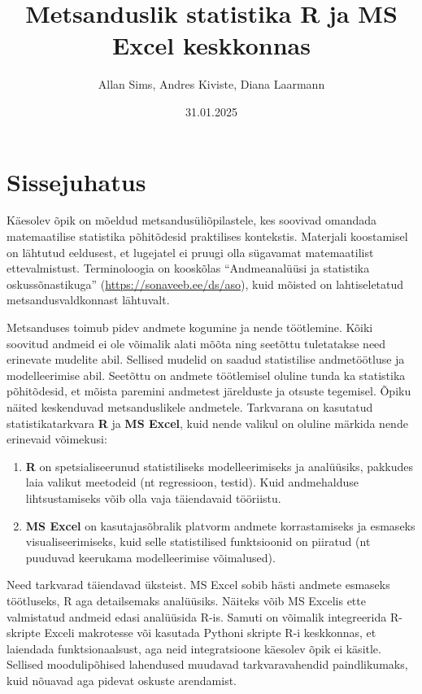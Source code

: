 \documentclass[
]{book}
\title{Metsanduslik statistika R ja MS Excel keskkonnas}
\author{Allan Sims, Andres Kiviste, Diana Laarmann}
\date{31.01.2025}
\providecommand{\tightlist}{%
  \setlength{\itemsep}{0pt}\setlength{\parskip}{0pt}}
\begin{document}
\maketitle

{
\setcounter{tocdepth}{1}
\tableofcontents
}
\chapter{Sissejuhatus}\label{sissejuhatus}

Käesolev õpik on mõeldud metsandusüliõpilastele, kes soovivad omandada matemaatilise statistika põhitõdesid praktilises kontekstis. Materjali koostamisel on lähtutud eeldusest, et lugejatel ei pruugi olla sügavamat matemaatilist ettevalmistust. Terminoloogia on kooskõlas ``Andmeanalüüsi ja statistika oskussõnastikuga'' (\url{https://sonaveeb.ee/ds/aso}), kuid mõisted on lahtiseletatud metsandusvaldkonnast lähtuvalt.

Metsanduses toimub pidev andmete kogumine ja nende töötlemine. Kõiki soovitud andmeid ei ole võimalik alati mõõta ning seetõttu tuletatakse need erinevate mudelite abil. Sellised mudelid on saadud statistilise andmetöötluse ja modelleerimise abil. Seetõttu on andmete töötlemisel oluline tunda ka statistika põhitõdesid, et mõista paremini andmetest järelduste ja otsuste tegemisel. Õpiku näited keskenduvad metsanduslikele andmetele. Tarkvarana on kasutatud statistikatarkvara \textbf{R} ja \textbf{MS Excel}, kuid nende valikul on oluline märkida nende erinevaid võimekusi:

\begin{enumerate}
\def\labelenumi{\arabic{enumi}.}
\tightlist
\item
  \textbf{R} on spetsialiseerunud statistiliseks modelleerimiseks ja analüüsiks, pakkudes laia valikut meetodeid (nt regressioon, testid). Kuid andmehalduse lihtsustamiseks võib olla vaja täiendavaid tööriistu.\\
\item
  \textbf{MS Excel} on kasutajasõbralik platvorm andmete korrastamiseks ja esmaseks visualiseerimiseks, kuid selle statistilised funktsioonid on piiratud (nt puuduvad keerukama modelleerimise võimalused).
\end{enumerate}

Need tarkvarad täiendavad üksteist. MS Excel sobib hästi andmete esmaseks töötluseks, R aga detailsemaks analüüsiks. Näiteks võib MS Excelis ette valmistatud andmeid edasi analüüsida R-is. Samuti on võimalik integreerida R-skripte Exceli makrotesse või kasutada Pythoni skripte R-i keskkonnas, et laiendada funktsionaalsust, aga neid integratsioone käesolev õpik ei käsitle. Sellised moodulipõhised lahendused muudavad tarkvaravahendid paindlikumaks, kuid nõuavad aga pidevat oskuste arendamist.
\end{document}
